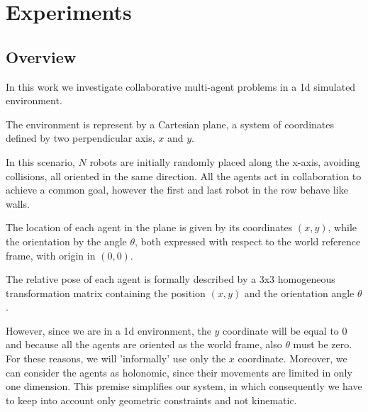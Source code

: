 \chapter{Experiments}
\label{chap:experiments}

\section{Overview}
\label{sec:overview}

In this work we investigate collaborative multi-agent problems in a \gls{1d} 
simulated environment.

The environment is represent by a Cartesian plane, a system of coordinates
defined by two perpendicular axis, $x$ and $y$. 

In this scenario, $N$ robots are initially randomly placed along the x-axis, 
avoiding collisions, all oriented in the same direction. All the agents act in 
collaboration to achieve a common goal, however the first and last robot in the 
row behave like walls. 

The location of each agent in the plane is given by its coordinates $(x, y)$, while 
the orientation by the angle $\theta$, both expressed with respect to the world 
reference frame, with origin in $(0, 0)$.

The relative pose of each agent is formally described by a 3x3 homogeneous 
transformation matrix containing the position $(x, y)$ and the orientation angle 
$\theta$. 

However, since we are in a \gls{1d} environment, the $y$ coordinate will be equal 
to $0$ and because all the agents are oriented as the world frame, also $\theta$ 
must be zero. 
For these reasons, we will 'informally' use only the $x$ coordinate. 
Moreover, we can consider the agents as holonomic, since their movements are 
limited in only one dimension. This premise simplifies our system, in which 
consequently we have to keep into account only geometric constraints and not
kinematic.



